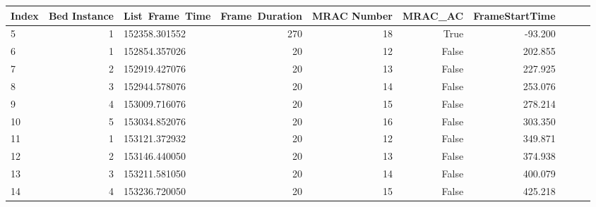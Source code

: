 \begin{table}[]
\begin{tabular}{lrlrrrrrlr}
\toprule
{Index} &  Bed Instance &  List\ Frame\ Time &  Frame\ Duration & MRAC Number &  MRAC\_AC &  FrameStartTime \\
\midrule
5  &         1 &  152358.301552 &            270 &           18 &          True &         -93.200 \\
6  &         1 &  152854.357026 &             20 &           12 &          False &         202.855 \\
7  &         2 &  152919.427076 &             20 &           13 &          False &         227.925 \\
8  &         3 &  152944.578076 &             20 &           14 &          False &         253.076 \\
9  &         4 &  153009.716076 &             20 &           15 &          False &         278.214 \\
10 &         5 &  153034.852076 &             20 &           16 &          False &         303.350 \\
11 &         1 &  153121.372932 &             20 &           12 &          False &         349.871 \\
12 &         2 &  153146.440050 &             20 &           13 &          False &         374.938 \\
13 &         3 &  153211.581050 &             20 &           14 &          False &         400.079 \\
14 &         4 &  153236.720050 &             20 &           15 &          False &         425.218 \\
\bottomrule
\end{tabular}
\end{table}



